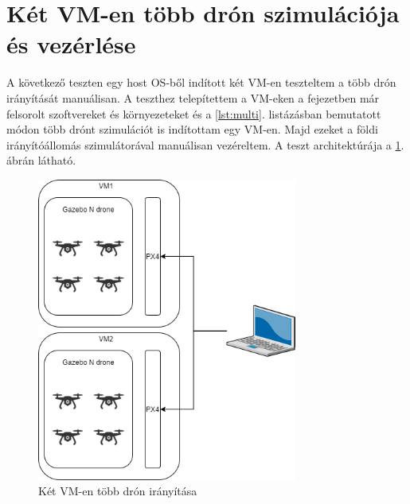 \section{Két VM-en több drón szimulációja és vezérlése}
A következő teszten egy host OS-ből indított két VM-en teszteltem a több drón irányítását manuálisan. A teszthez telepítettem a VM-eken a fejezetben már felsorolt szoftvereket és környezeteket és a \ref{lst:multi}. listázásban bemutatott módon több drónt szimulációt is indítottam egy VM-en. Majd ezeket a földi irányítóállomás szimulátorával manuálisan vezéreltem. A teszt architektúrája a \ref{fig:ketvm}. ábrán látható.
\begin{figure}
	\centering
	\includegraphics[height=10cm]{figures/multi-control.png}
	\caption{Két VM-en több drón irányítása}
	\label{fig:ketvm}
\end{figure}
